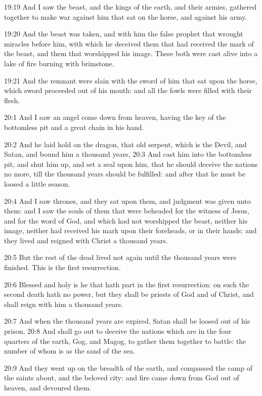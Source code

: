 19:19 And I saw the beast, and the kings of the earth, and their
armies, gathered together to make war against him that sat on the
horse, and against his army.

19:20 And the beast was taken, and with him the false prophet that
wrought miracles before him, with which he deceived them that had
received the mark of the beast, and them that worshipped his image.
These both were cast alive into a lake of fire burning with brimstone.

19:21 And the remnant were slain with the sword of him that sat upon
the horse, which sword proceeded out of his mouth: and all the fowls
were filled with their flesh.

20:1 And I saw an angel come down from heaven, having the key of the
bottomless pit and a great chain in his hand.

20:2 And he laid hold on the dragon, that old serpent, which is the
Devil, and Satan, and bound him a thousand years, 20:3 And cast him
into the bottomless pit, and shut him up, and set a seal upon him,
that he should deceive the nations no more, till the thousand years
should be fulfilled: and after that he must be loosed a little season.

20:4 And I saw thrones, and they sat upon them, and judgment was given
unto them: and I saw the souls of them that were beheaded for the
witness of Jesus, and for the word of God, and which had not
worshipped the beast, neither his image, neither had received his mark
upon their foreheads, or in their hands; and they lived and reigned
with Christ a thousand years.

20:5 But the rest of the dead lived not again until the thousand years
were finished. This is the first resurrection.

20:6 Blessed and holy is he that hath part in the first resurrection:
on such the second death hath no power, but they shall be priests of
God and of Christ, and shall reign with him a thousand years.

20:7 And when the thousand years are expired, Satan shall be loosed
out of his prison, 20:8 And shall go out to deceive the nations which
are in the four quarters of the earth, Gog, and Magog, to gather them
together to battle: the number of whom is as the sand of the sea.

20:9 And they went up on the breadth of the earth, and compassed the
camp of the saints about, and the beloved city: and fire came down
from God out of heaven, and devoured them.

